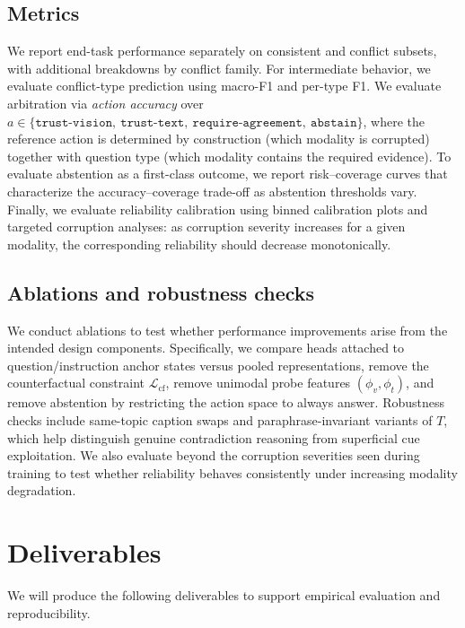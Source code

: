 \documentclass{article}
\begin{document}
\subsection{Metrics}
We report end-task performance separately on consistent and conflict subsets, with additional breakdowns by conflict family. For intermediate behavior, we evaluate conflict-type prediction using macro-F1 and per-type F1. We evaluate arbitration via \emph{action accuracy} over $a \in \{\texttt{trust-vision},\ \texttt{trust-text},\ \texttt{require-agreement},\ \texttt{abstain}\}$, where the reference action is determined by construction (which modality is corrupted) together with question type (which modality contains the required evidence). To evaluate abstention as a first-class outcome, we report risk--coverage curves that characterize the accuracy--coverage trade-off as abstention thresholds vary. Finally, we evaluate reliability calibration using binned calibration plots and targeted corruption analyses: as corruption severity increases for a given modality, the corresponding reliability should decrease monotonically.

\subsection{Ablations and robustness checks}
We conduct ablations to test whether performance improvements arise from the intended design components. Specifically, we compare heads attached to question/instruction anchor states versus pooled representations, remove the counterfactual constraint $\mathcal{L}_{\mathrm{cf}}$, remove unimodal probe features $(\phi_v,\phi_t)$, and remove abstention by restricting the action space to always answer. Robustness checks include same-topic caption swaps and paraphrase-invariant variants of $T$, which help distinguish genuine contradiction reasoning from superficial cue exploitation. We also evaluate beyond the corruption severities seen during training to test whether reliability behaves consistently under increasing modality degradation.

\section{Deliverables}
\label{sec:deliverables}

We will produce the following deliverables to support empirical evaluation and reproducibility.
\end{document}
